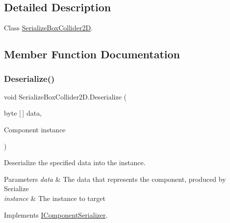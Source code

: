 \subsection{Detailed Description}
Class \hyperlink{class_serialize_box_collider2_d}{Serialize\+Box\+Collider2D}. 



\subsection{Member Function Documentation}
\mbox{\label{class_serialize_box_collider2_d_ad00de81c7e9e81bc30beb97194f34e17}} 
\subsubsection{\texorpdfstring{Deserialize()}{Deserialize()}}
{\footnotesize\ttfamily void Serialize\+Box\+Collider2\+D.\+Deserialize (\begin{DoxyParamCaption}\item[{byte \mbox{[}$\,$\mbox{]}}]{data,  }\item[{Component}]{instance }\end{DoxyParamCaption})\hspace{0.3cm}{\ttfamily [inline]}}



Deserialize the specified data into the instance. 


\begin{DoxyParams}{Parameters}
{\em data} & The data that represents the component, produced by Serialize\\
\hline
{\em instance} & The instance to target\\
\hline
\end{DoxyParams}


Implements \hyperlink{interface_i_component_serializer_a4cc366a5c78b33d47a90c209d8fed883}{I\+Component\+Serializer}.

\mbox{\label{class_serialize_box_collider2_d_ab002b432810dbe5029e486b8f0a85878}} 
